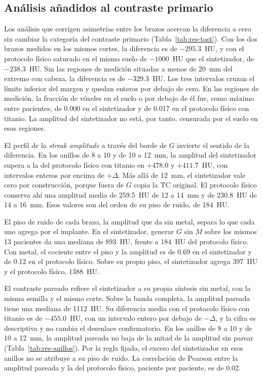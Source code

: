 \subsection{Análisis añadidos al contraste primario}\label{sec:res-anadidos}

Los análisis que corrigen asimetrías entre los brazos acercan la diferencia a cero sin cambiar la categoría del contraste primario (Tabla~\ref{tab:res-tost}). Con los dos brazos medidos en los mismos cortes, la diferencia es de $-295.3$~HU, y con el protocolo físico saturado en el mismo suelo de $-1000$~HU que el sintetizador, de $-238.3$~HU. Sin las regiones de medición situadas a menos de 20~mm del extremo con cabeza, la diferencia es de $-329.3$~HU. Los tres intervalos cruzan el límite inferior del margen y quedan enteros por debajo de cero. En las regiones de medición, la fracción de vóxeles en el suelo o por debajo de él fue, como máximo entre pacientes, de 0.000 en el sintetizador y de 0.017 en el protocolo físico con titanio. La amplitud del sintetizador no está, por tanto, censurada por el suelo en esas regiones.

El perfil de la \emph{streak amplitude} a través del borde de $G$ invierte el sentido de la diferencia. En los anillos de 8 a 10 y de 10 a 12~mm, la amplitud del sintetizador supera a la del protocolo físico con titanio en $+478.0$ y $+411.7$~HU, con intervalos enteros por encima de $+\Delta$. Más allá de 12~mm, el sintetizador vale cero por construcción, porque fuera de $G$ copia la TC original. El protocolo físico conserva ahí una amplitud media de 259.5~HU de 12 a 14~mm y de 230.8~HU de 14 a 16~mm. Esos valores son del orden de su piso de ruido, de 184~HU.

El piso de ruido de cada brazo, la amplitud que da sin metal, separa lo que cada uno agrega por el implante. En el sintetizador, generar $G$ sin $M$ sobre los mismos 13 pacientes da una mediana de 893~HU, frente a 184~HU del protocolo físico. Con metal, el cociente entre el piso y la amplitud es de 0.69 en el sintetizador y de 0.12 en el protocolo físico. Sobre su propio piso, el sintetizador agrega 397~HU y el protocolo físico, 1388~HU.

El contraste pareado refiere el sintetizador a su propia síntesis sin metal, con la misma semilla y el mismo corte. Sobre la banda completa, la amplitud pareada tiene una mediana de 1112~HU. Su diferencia media con el protocolo físico con titanio es de $-455.0$~HU, con un intervalo entero por debajo de $-\Delta$, y la cifra es descriptiva y no cambia el desenlace confirmatorio. En los anillos de 8 a 10 y de 10 a 12~mm, la amplitud pareada no baja de la mitad de la amplitud sin parear (Tabla~\ref{tab:res-anillos}). Por la regla fijada, el exceso del sintetizador en esos anillos no se atribuye a su piso de ruido. La correlación de Pearson entre la amplitud pareada y la del protocolo físico, paciente por paciente, es de 0.02.

